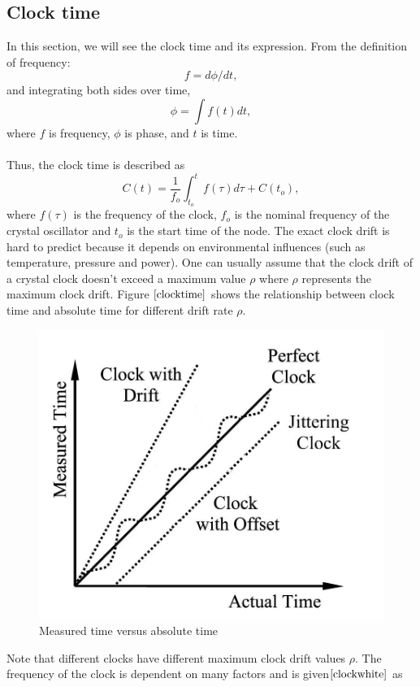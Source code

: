 \documentclass[a4paper,10pt]{report}
\begin{document}
\subsection{\textbf{Clock time}}
In this section, we will see the clock time and its expression. From the definition of frequency:
\begin{equation}
f = d\phi/dt \label{freq_defn} ,
\end{equation}
and integrating both sides over time,
 \begin{equation}
\phi =\int f(t)dt ,
 \end{equation}
where $f$ is frequency, $\phi$ is phase, and $t$ is time.\paragraph*{}
Thus, the clock time is described as
\begin{equation}
C(t) = \frac{1}{f_o}\int_{t_o}^{t} {f(\tau)d\tau} + C(t_o) ,
\label{clock}
\end{equation}
where $f(\tau)$ is the frequency of the clock, $f_o$ is the nominal frequency of the crystal oscillator and $t_o$ is the start time of
the node. The exact clock drift is hard to predict because it depends on environmental influences (such as temperature, pressure
and power). One can usually assume that the clock drift of a crystal clock doesn't exceed a maximum value $\rho$ where $\rho$ represents the maximum clock drift. Figure $\ref{clocktime}$ shows the relationship between clock time and absolute time for different drift rate $\rho$.
\begin{figure}
\centering
\includegraphics[width=0.5 \textwidth]{actualvsmeasuredtime}
\caption{Measured time versus absolute time} \label{clocktime}
\end{figure}
Note that different clocks have different maximum clock drift values
$\rho$. The frequency of the clock is dependent on many factors and is given$\cite{clockwhite}$ as
\end{document}
